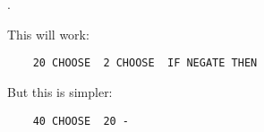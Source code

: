 \section{}
\setcounter{exercise}{0}
\begin{list}%
{.}{
    \setlength{\rightmargin}{\leftmargin}}
\item This will work:
\begin{verbatim}
    20 CHOOSE  2 CHOOSE  IF NEGATE THEN
\end{verbatim}
But this is simpler:
\begin{verbatim}
    40 CHOOSE  20 -
\end{verbatim}
\end{list}
